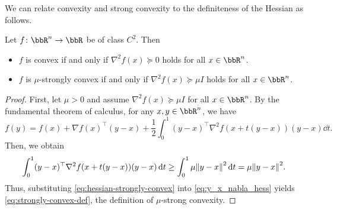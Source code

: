 \documentclass[en]{subfiles}
\begin{document}
We can relate convexity and strong convexity to the definiteness of the Hessian as follows.
\begin{proposition}\label{prop:convexity-hessian}
    Let $f \colon \bbR^n \to \bbR$ be of class $C^2$. Then
    \begin{itemize}
        \item $f$ is convex if and only if $\nabla^2 f(x)\succeq0$ holds for all $x \in \bbR^n$.
        \item $f$ is $\mu$-strongly convex if and only if $\nabla^2 f(x)\succeq\mu I$ holds for all $x \in \bbR^n$.
    \end{itemize}
\end{proposition}
\begin{proof}
    First, let $\mu>0$ and assume $\nabla^2 f(x)\succeq \mu I$ for all $x \in \bbR^n$.
    By the fundamental theorem of calculus, for any $x,y \in \bbR^n$, we have
    \begin{equation}\label{eq:y_x_nabla_hess}
        f(y)
        = f(x)+\nabla f(x)^\top (y-x)
        +\frac{1}{2} \int_0^1 (y-x)^\top \nabla^2 f(x+t(y-x))(y-x) \dd{t}.
    \end{equation}
    Then, we obtain
    \begin{equation}\label{eq:hessian-strongly-convex}
        \int_0^1 (y-x)^\top \nabla^2 f(x+t(y-x))(y-x) \dd{t}
        \ge \int_0^1 \mu\norm{y-x}^2 \dd{t}
        = \mu\norm{y-x}^2.
    \end{equation}
    Thus, substituting \cref{eq:hessian-strongly-convex} into \cref{eq:y_x_nabla_hess} yields \cref{eq:strongly-convex-def}, the definition of $\mu$-strong convexity.


\end{proof}
\end{document}
